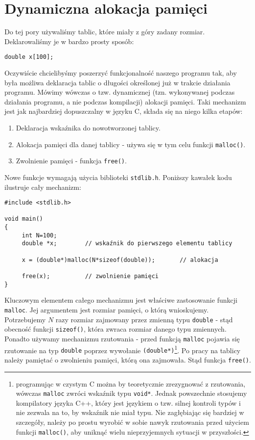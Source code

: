 \documentclass{instrukcja}
\begin{document}
\author{W. Regulski}
\materialtitle

\section*{Dynamiczna alokacja pamięci}
Do tej pory używaliśmy tablic, które miały z góry zadany rozmiar. Deklarowaliśmy je w bardzo prosty sposób:
\begin{verbatim}
double x[100];
\end{verbatim}

Oczywiście chcielibyśmy poszerzyć funkcjonalność naszego programu tak, aby była możliwa deklaracja  tablic o długości określonej już w trakcie działania programu. Mówimy wówczas o tzw. dynamicznej (tzn. wykonywanej podczas działania programu, a nie podczas kompilacji) alokacji pamięci. Taki mechanizm jest jak najbardziej dopuszczalny w języku C, składa się na niego kilka etapów:

\begin{enumerate}
\item Deklaracja wskaźnika do nowotworzonej tablicy.
\item Alokacja pamięci dla danej tablicy - używa się w tym celu funkcji {\tt malloc()}.
\item Zwolnienie pamięci - funkcja {\tt free()}.
\end{enumerate}

Nowe funkcje wymagają użycia biblioteki {\tt stdlib.h}.
Poniższy kawałek kodu ilustruje cały mechanizm:

\begin{verbatim}
#include <stdlib.h>

void main()
{
     int N=100;
     double *x;        // wskaźnik do pierwszego elementu tablicy
     
     x = (double*)malloc(N*sizeof(double));       // alokacja

     free(x);          // zwolnienie pamięci
}
\end{verbatim}

Kluczowym elementem całego mechanizmu jest właściwe zastosowanie funkcji {\tt malloc}. Jej argumentem jest rozmiar pamięci, o którą wnioskujemy. Potrzebujemy \(N\) razy rozmiar zajmowany przez zmienną typu {\tt double} - stąd obecność funkcji {\tt sizeof()}, która zwraca rozmiar danego typu zmiennych. Ponadto używamy mechanizmu rzutowania - przed funkcją {\tt malloc} pojawia się rzutowanie na typ {\tt double} poprzez wywołanie {\tt (double*)}\footnote{programując w czystym C można by teoretycznie zrezygnować z rzutowania, wówczas {\tt malloc} zwróci wskaźnik typu {\tt void*}. Jednak powszechnie stosujemy kompilatory języka C++, który jest językiem o tzw. silnej kontroli typów i nie zezwala na to, by wskaźnik nie miał typu. Nie zagłębiając się bardziej w szczegóły, należy po prostu wyrobić w sobie nawyk rzutowania przed użyciem funkcji {\tt malloc()}, aby uniknąć wielu nieprzyjemnych sytuacji w przyszłości. }. Po pracy na tablicy należy pamiętać o zwolnieniu pamięci, którą ona zajmowała. Stąd funkcja {\tt free()}.
\end{document}
